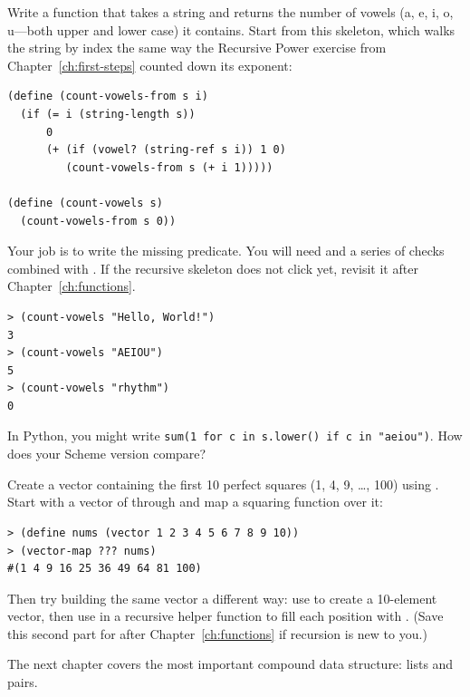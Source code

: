 \begin{exercise}
Write a function  that takes a string and returns the number of vowels (a, e, i, o, u---both upper and lower case) it contains. Start from this skeleton, which walks the string by index the same way the Recursive Power exercise from Chapter~\ref{ch:first-steps} counted down its exponent:

\begin{lstlisting}
(define (count-vowels-from s i)
  (if (= i (string-length s))
      0
      (+ (if (vowel? (string-ref s i)) 1 0)
         (count-vowels-from s (+ i 1)))))

(define (count-vowels s)
  (count-vowels-from s 0))
\end{lstlisting}

Your job is to write the missing  predicate. You will need  and a series of  checks combined with . If the recursive skeleton does not click yet, revisit it after Chapter~\ref{ch:functions}.

\begin{lstlisting}[style=repl]
> (count-vowels "Hello, World!")
3
> (count-vowels "AEIOU")
5
> (count-vowels "rhythm")
0
\end{lstlisting}

In Python, you might write \texttt{sum(1 for c in s.lower() if c in "aeiou")}. How does your Scheme version compare?
\end{exercise}

\begin{exercise}
Create a vector containing the first 10 perfect squares (1, 4, 9, \ldots, 100) using . Start with a vector of  through  and map a squaring function over it:

\begin{lstlisting}[style=repl]
> (define nums (vector 1 2 3 4 5 6 7 8 9 10))
> (vector-map ??? nums)
#(1 4 9 16 25 36 49 64 81 100)
\end{lstlisting}

Then try building the same vector a different way: use  to create a 10-element vector, then use  in a recursive helper function to fill each position with . (Save this second part for after Chapter~\ref{ch:functions} if recursion is new to you.)
\end{exercise}

The next chapter covers the most important compound data structure: lists and pairs.

\chapterend
